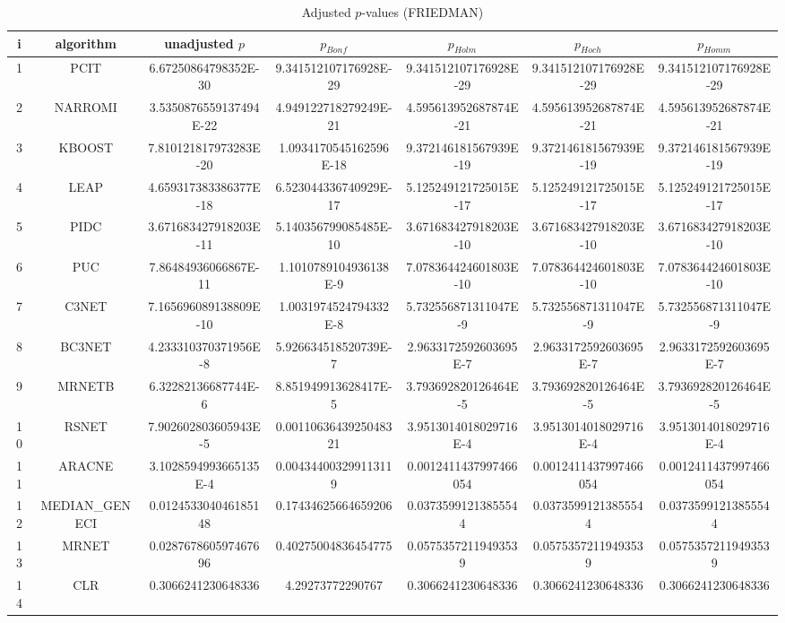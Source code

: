 \documentclass[a4paper,10pt]{article}
\begin{document}
\begin{landscape}
\begin{table}[!htp]
\centering\scriptsize
\caption{Adjusted $p$-values (FRIEDMAN)}
\begin{tabular}{ccccccc}
i&algorithm&unadjusted $p$&$p_{Bonf}$&$p_{Holm}$&$p_{Hoch}$&$p_{Homm}$\\
\hline
1&PCIT&6.67250864798352E-30&9.341512107176928E-29&9.341512107176928E-29&9.341512107176928E-29&9.341512107176928E-29\\
2&NARROMI&3.5350876559137494E-22&4.949122718279249E-21&4.595613952687874E-21&4.595613952687874E-21&4.595613952687874E-21\\
3&KBOOST&7.810121817973283E-20&1.0934170545162596E-18&9.372146181567939E-19&9.372146181567939E-19&9.372146181567939E-19\\
4&LEAP&4.659317383386377E-18&6.523044336740929E-17&5.125249121725015E-17&5.125249121725015E-17&5.125249121725015E-17\\
5&PIDC&3.671683427918203E-11&5.140356799085485E-10&3.671683427918203E-10&3.671683427918203E-10&3.671683427918203E-10\\
6&PUC&7.86484936066867E-11&1.1010789104936138E-9&7.078364424601803E-10&7.078364424601803E-10&7.078364424601803E-10\\
7&C3NET&7.165696089138809E-10&1.0031974524794332E-8&5.732556871311047E-9&5.732556871311047E-9&5.732556871311047E-9\\
8&BC3NET&4.233310370371956E-8&5.926634518520739E-7&2.9633172592603695E-7&2.9633172592603695E-7&2.9633172592603695E-7\\
9&MRNETB&6.32282136687744E-6&8.851949913628417E-5&3.793692820126464E-5&3.793692820126464E-5&3.793692820126464E-5\\
10&RSNET&7.902602803605943E-5&0.0011063643925048321&3.9513014018029716E-4&3.9513014018029716E-4&3.9513014018029716E-4\\
11&ARACNE&3.1028594993665135E-4&0.004344003299113119&0.0012411437997466054&0.0012411437997466054&0.0012411437997466054\\
12&MEDIAN_GENECI&0.012453304046185148&0.17434625664659206&0.03735991213855544&0.03735991213855544&0.03735991213855544\\
13&MRNET&0.028767860597467696&0.40275004836454775&0.05753572119493539&0.05753572119493539&0.05753572119493539\\
14&CLR&0.3066241230648336&4.29273772290767&0.3066241230648336&0.3066241230648336&0.3066241230648336\\
\hline
\end{tabular}
\end{table}


\end{landscape}
\end{document}
